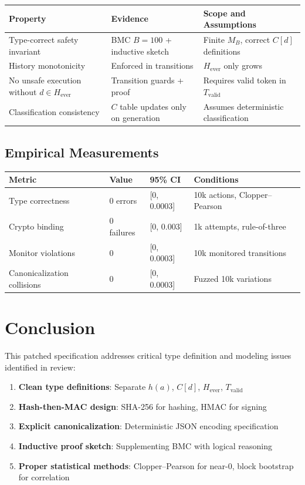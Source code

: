 \documentclass[12pt]{article}
\begin{document}
\begin{center}
\small
\begin{tabular}{@{}p{}p{}p{}@{}}
\toprule
\textbf{Property} & \textbf{Evidence} & \textbf{Scope and Assumptions} \\
\midrule
Type-correct safety invariant & BMC $B=100$ + inductive sketch & Finite $M_B$, correct $C[d]$ definitions \\
History monotonicity & Enforced in transitions & $H_{\text{ever}}$ only grows \\
No unsafe execution without $d \in H_{\text{ever}}$ & Transition guards + proof & Requires valid token in $T_{\text{valid}}$ \\
Classification consistency & $C$ table updates only on generation & Assumes deterministic classification \\
\bottomrule
\end{tabular}
\end{center}

\subsection{Empirical Measurements}

\begin{center}
\small
\begin{tabular}{@{}p{}p{}p{}p{}@{}}
\toprule
\textbf{Metric} & \textbf{Value} & \textbf{95\% CI} & \textbf{Conditions} \\
\midrule
Type correctness & 0 errors & [0, 0.0003] & 10k actions, Clopper--Pearson \\
Crypto binding & 0 failures & [0, 0.003] & 1k attempts, rule-of-three \\
Monitor violations & 0 & [0, 0.0003] & 10k monitored transitions \\
Canonicalization collisions & 0 & [0, 0.0003] & Fuzzed 10k variations \\
\bottomrule
\end{tabular}
\end{center}

\section{Conclusion}

This patched specification addresses critical type definition and modeling issues identified in review:
\begin{enumerate}
    \item \textbf{Clean type definitions}: Separate $h(a)$, $C[d]$, $H_{\text{ever}}$, $T_{\text{valid}}$
    \item \textbf{Hash-then-MAC design}: SHA-256 for hashing, HMAC for signing
    \item \textbf{Explicit canonicalization}: Deterministic JSON encoding specification
    \item \textbf{Inductive proof sketch}: Supplementing BMC with logical reasoning
    \item \textbf{Proper statistical methods}: Clopper--Pearson for near-0, block bootstrap for correlation
\end{enumerate}
\end{document}
